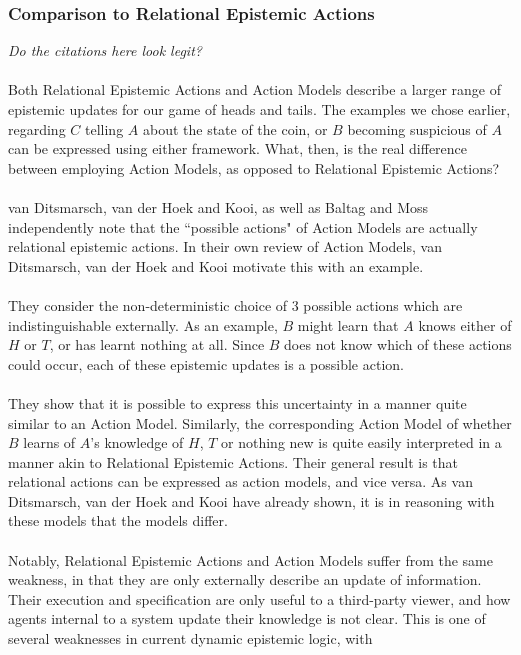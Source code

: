 \documentclass[12pt, a4paper, twoside]{article}
\begin{document}
\subsubsection{Comparison to Relational Epistemic Actions} \label{epi_compare}
{\em Do the citations here look legit?}\\
\\
Both Relational Epistemic Actions and Action Models describe a larger range of
epistemic updates for our game of heads and tails.
The examples we chose earlier, regarding $C$ telling $A$ about the state of the
coin, or $B$ becoming suspicious of $A$ can be expressed using either framework.
What, then, is the real difference between employing Action Models, as opposed
to Relational Epistemic Actions?\\
\\
van Ditsmarsch, van der Hoek and Kooi, as well as Baltag and Moss independently
note that the ``possible actions" of Action Models  are actually relational
epistemic actions.
In their own review of Action Models, van Ditsmarsch, van der Hoek and Kooi
motivate this with an example. \citep{hoek2008dynamic,baltag2005programs}\\
\\
They consider the non-deterministic choice of 3 possible actions which are
indistinguishable externally.
As an example, $B$ might learn that $A$ knows either of $H$ or $T$, or has
learnt nothing at all.
Since $B$ does not know which of these actions could occur, each of these
epistemic updates is a possible action.\\
\\
They show that it is possible to express this uncertainty in a manner quite similar
to an Action Model.
Similarly, the corresponding Action Model of whether $B$ learns of $A$'s
knowledge of $H$, $T$ or nothing new is quite easily interpreted in a manner
akin to Relational Epistemic Actions.
Their general result is that relational actions can be expressed as action
models, and vice versa.
As van Ditsmarsch, van der Hoek and Kooi have already shown, it is in reasoning
with these models that the models differ.\\
\\
Notably, Relational Epistemic Actions and Action Models suffer from the same
weakness, in that they are only externally describe an update of information.
Their execution and specification are only useful to a third-party viewer, and
how agents internal to a system update their knowledge is not clear.
This is one of several weaknesses in current dynamic epistemic logic, with
\end{document}

